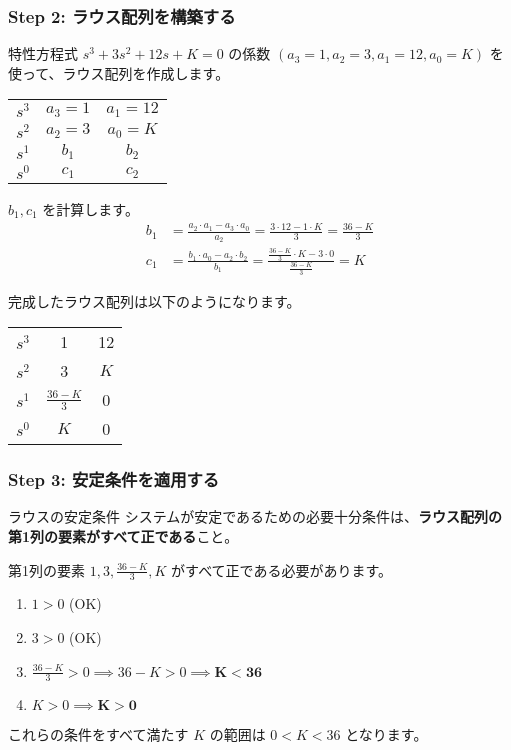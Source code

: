 \documentclass[11pt,a4paper]{ltjsarticle}
\begin{document}
\subsubsection{Step 2: ラウス配列を構築する}
特性方程式 $s^3+3s^2+12s+K=0$ の係数 $(a_3=1, a_2=3, a_1=12, a_0=K)$ を使って、ラウス配列を作成します。

\begin{center}
\begin{tabular}{c|cc}
\toprule
$s^3$ & $a_3=1$ & $a_1=12$ \\
$s^2$ & $a_2=3$ & $a_0=K$ \\
$s^1$ & $b_1$ & $b_2$ \\
$s^0$ & $c_1$ & $c_2$ \\
\bottomrule
\end{tabular}
\end{center}

$b_1, c_1$ を計算します。
\begin{align*}
b_1 &= \frac{a_2 \cdot a_1 - a_3 \cdot a_0}{a_2} = \frac{3 \cdot 12 - 1 \cdot K}{3} = \frac{36-K}{3} \\
c_1 &= \frac{b_1 \cdot a_0 - a_2 \cdot b_2}{b_1} = \frac{\frac{36-K}{3} \cdot K - 3 \cdot 0}{\frac{36-K}{3}} = K
\end{align*}

完成したラウス配列は以下のようになります。

\begin{center}
\begin{tabular}{c|cc}
\toprule
$s^3$ & 1 & 12 \\
$s^2$ & 3 & $K$ \\
$s^1$ & $\frac{36-K}{3}$ & 0 \\
$s^0$ & $K$ & 0 \\
\bottomrule
\end{tabular}
\end{center}

\subsubsection{Step 3: 安定条件を適用する}
\begin{theorem}{ラウスの安定条件}
    システムが安定であるための必要十分条件は、\textbf{ラウス配列の第1列の要素がすべて正である}こと。
\end{theorem}

第1列の要素 $1, 3, \frac{36-K}{3}, K$ がすべて正である必要があります。
\begin{enumerate}
    \item $1 > 0$ (OK)
    \item $3 > 0$ (OK)
    \item $\frac{36-K}{3} > 0 \implies 36-K > 0 \implies \bm{K < 36}$
    \item $K > 0 \implies \bm{K > 0}$
\end{enumerate}
これらの条件をすべて満たす $K$ の範囲は $0 < K < 36$ となります。
\end{document}
